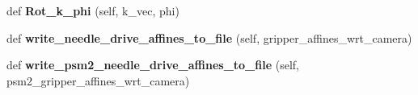 \begin{DoxyCompactItemize}
\item 
def {\bfseries Rot\+\_\+k\+\_\+phi} (self, k\+\_\+vec, phi)\hypertarget{classneedle__planner__camera__working_1_1needle__planner_ad11e69862484aa71a07360b4ea1b041e}{}\label{classneedle__planner__camera__working_1_1needle__planner_ad11e69862484aa71a07360b4ea1b041e}

\item 
def {\bfseries write\+\_\+needle\+\_\+drive\+\_\+affines\+\_\+to\+\_\+file} (self, gripper\+\_\+affines\+\_\+wrt\+\_\+camera)\hypertarget{classneedle__planner__camera__working_1_1needle__planner_a5e5e787b60d5420ef680bbd883d0f4b9}{}\label{classneedle__planner__camera__working_1_1needle__planner_a5e5e787b60d5420ef680bbd883d0f4b9}

\item 
def {\bfseries write\+\_\+psm2\+\_\+needle\+\_\+drive\+\_\+affines\+\_\+to\+\_\+file} (self, psm2\+\_\+gripper\+\_\+affines\+\_\+wrt\+\_\+camera)\hypertarget{classneedle__planner__camera__working_1_1needle__planner_a940ab38bee26cc2b22693b82177ac9c0}{}\label{classneedle__planner__camera__working_1_1needle__planner_a940ab38bee26cc2b22693b82177ac9c0}

\end{DoxyCompactItemize}
